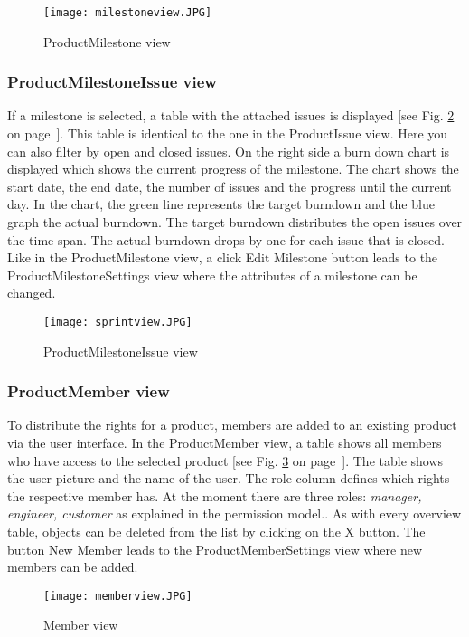     \begin{figure}[h]
        \centering
        \texttt{[image: milestoneview.JPG]}
        \caption{ProductMilestone view}
        \label{fig: milestoneview}
    \end{figure}

    \subsubsection*{ProductMilestoneIssue view}
    If a milestone is selected, a table with the attached issues is displayed [see Fig. \ref{fig: sprintview} on page~\pageref{fig: sprintview}]. This table is identical to the one in the ProductIssue view. Here you can also filter by open and closed issues. On the right side a burn down chart is displayed which shows the current progress of the milestone. The chart shows the start date, the end date, the number of issues and the progress until the current day. In the chart, the green line represents the target burndown and the blue graph the actual burndown. The target burndown distributes the open issues over the time span. The actual burndown drops by one for each issue that is closed.  Like in the ProductMilestone view, a click Edit Milestone button leads to the ProductMilestoneSettings view where the attributes of a milestone can be changed.

    \begin{figure}[h]
        \centering
        \texttt{[image: sprintview.JPG]}
        \caption{ProductMilestoneIssue view}
        \label{fig: sprintview}
    \end{figure}

    \subsubsection*{ProductMember view}
    To distribute the rights for a product, members are added to an existing product via the user interface. In the ProductMember view, a table shows all members who have access to the selected product [see Fig. \ref{fig: memberview} on page~\pageref{fig: memberview}]. The table shows the user picture and the name of the user. The role column defines which rights the respective member has. At the moment there are three roles: \textit{manager, engineer, customer} as explained in the permission model.. As with every overview table, objects can be deleted from the list by clicking on the X button. The button New Member leads to the ProductMemberSettings view where new members can be added.
    
    \begin{figure}[h]
        \centering
        \texttt{[image: memberview.JPG]}
        \caption{Member view}
        \label{fig: memberview}
    \end{figure}
